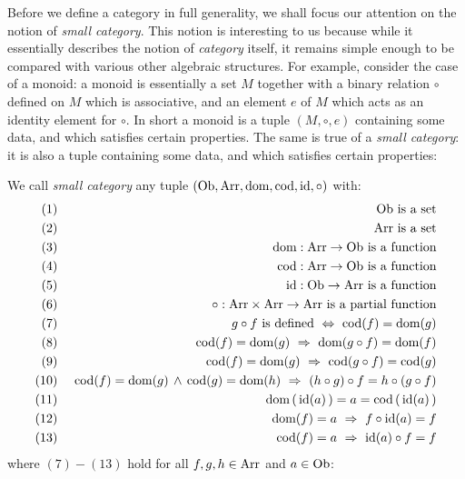 Before we define a category in full generality, we shall focus our attention
on the notion of {\em small category}. This notion is interesting to us 
because while it essentially describes the notion of {\em category} itself,
it remains simple enough to be compared with various other algebraic structures.
For example, consider the case of a monoid: a monoid is essentially a set $M$ 
together with 
a binary relation $\circ$ defined on $M$ which is associative, and an 
element $e$ of $M$ which acts as an identity element for $\circ$. In short 
a monoid is a tuple $(M,\circ,e)$ containing some data, and  which satisfies
certain properties. The same is true of a {\em small category}: it is also
a tuple containing some data, and which satisfies certain properties:
\begin{defin}\label{Cat:def:category:small}
    We call {\em small category} any tuple $(\mbox{\rm Ob}, \mbox{\rm Arr}, \mbox{\rm dom}, \mbox{\rm cod}, \mbox{\rm id}, \circ)$ 
    with:
        \begin{eqnarray*}
            (1)&\ &\mbox{\rm Ob}\mbox{\ is a set}\\
            (2)&\ &\mbox{\rm Arr}\mbox{\ is a set}\\
            (3)&\ &\mbox{\rm dom}:\mbox{\rm Arr}\to\mbox{\rm Ob}\mbox{\ is a function}\\
            (4)&\ &\mbox{\rm cod}:\mbox{\rm Arr}\to\mbox{\rm Ob}\mbox{\ is a function}\\
            (5)&\ &\mbox{\rm id}:\mbox{\rm Ob}\to\mbox{\rm Arr}\mbox{\ is a function}\\
            (6)&\ &\circ:\mbox{\rm Arr}\times\mbox{\rm Arr}\to\mbox{\rm Arr}\mbox{\ is a partial function}\\
            (7)&\ &g\circ f\mbox{\ is defined}
                \ \Leftrightarrow\ \mbox{\rm cod}(f)=\mbox{\rm dom}(g) \\
            (8)&\ &\mbox{\rm cod}(f)=\mbox{\rm dom}(g)\ \Rightarrow\ \mbox{\rm dom}(g\circ f) = \mbox{\rm dom}(f)\\
            (9)&\ &\mbox{\rm cod}(f)=\mbox{\rm dom}(g)\ \Rightarrow\ \mbox{\rm cod}(g\circ f) = \mbox{\rm cod}(g)\\
            (10)&\ &\mbox{\rm cod}(f)=\mbox{\rm dom}(g)\,\land\,\mbox{\rm cod}(g)=\mbox{\rm dom}(h)
               \ \Rightarrow\ (h\circ g)\circ f = h\circ(g\circ f)\\
            (11)&\ &\mbox{\rm dom}\,(\,\mbox{\rm id}(a)\,) = a = \mbox{\rm cod}\,(\,\mbox{\rm id}(a)\,)\\
            (12)&\ &\mbox{\rm dom}(f)=a\ \Rightarrow\ f\circ\mbox{\rm id}(a) = f\\
            (13)&\ &\mbox{\rm cod}(f)=a\ \Rightarrow\ \mbox{\rm id}(a)\circ f = f
       \end{eqnarray*} 
    where $(7)-(13)$ hold for all $f,g,h\in\mbox{\rm Arr}$ and $a\in\mbox{\rm Ob}$: 
\end{defin}

